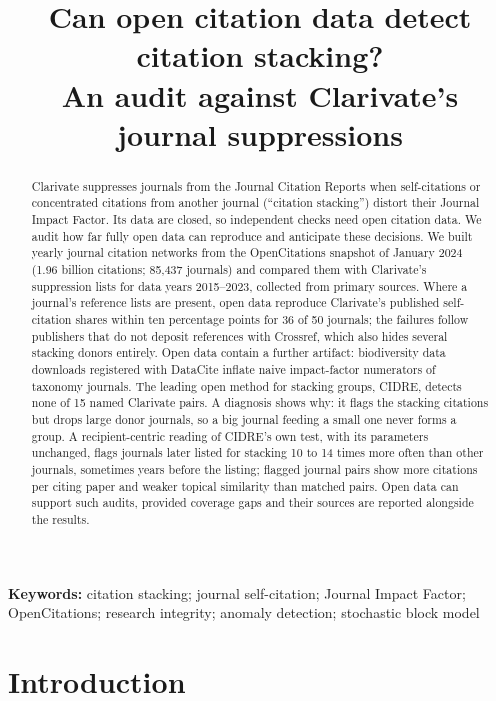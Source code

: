 \documentclass[11pt]{article}
\title{Can open citation data detect citation stacking?\\
An audit against Clarivate's journal suppressions}
\author{\todo{authors}}
\date{}
\begin{document}
\maketitle

\begin{abstract}
Clarivate suppresses journals from the Journal Citation Reports when self-citations or concentrated citations from
another journal (``citation stacking'') distort their Journal Impact Factor. Its data are closed, so independent
checks need open citation data. We audit how far fully open data can reproduce and anticipate these decisions. We
built yearly journal citation networks from the OpenCitations snapshot of January 2024 (1.96 billion citations;
85,437 journals) and compared them with Clarivate's suppression lists for data years 2015--2023, collected from
primary sources. Where a journal's reference lists are present, open data reproduce Clarivate's published
self-citation shares within ten percentage points for 36 of 50 journals; the failures follow publishers that do not
deposit references with Crossref, which also hides several stacking donors entirely. Open data contain a further
artifact: biodiversity data downloads registered with DataCite inflate naive impact-factor numerators of taxonomy
journals. The leading open method for stacking groups, CIDRE, detects none of 15 named Clarivate pairs. A
diagnosis shows why: it flags the stacking citations but drops large donor journals, so a big journal feeding a small
one never forms a group. A recipient-centric reading of CIDRE's own test, with its parameters unchanged, flags
journals later listed for stacking 10 to 14 times more often than other journals, sometimes years before the
listing; flagged journal pairs show more citations per citing paper and weaker topical similarity than matched pairs.
Open data can support such audits, provided coverage gaps and their sources are reported alongside the results.
\end{abstract}

\noindent\textbf{Keywords:} citation stacking; journal self-citation; Journal Impact Factor; OpenCitations;
research integrity; anomaly detection; stochastic block model

\section{Introduction}\label{sec:intro}
\end{document}
